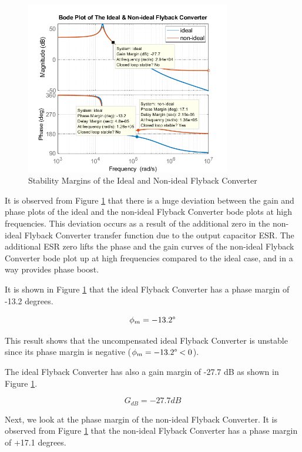 \begin{figure}[H]
\begin{center}
\includegraphics[width=0.8\textwidth]{bode_plots/gain_margin.png}
\caption{Stability Margins of the Ideal and Non-ideal Flyback Converter}
\label{com:bode3}
\end{center}
\end{figure}

It is observed from Figure \ref{com:bode3} that there is a huge deviation between the gain and phase plots of the ideal and the non-ideal Flyback Converter bode plots at high frequencies. This deviation occurs as a result of the additional zero in the non-ideal Flyback Converter transfer function due to the output capacitor ESR. The additional ESR zero lifts the phase and the gain curves of the non-ideal Flyback Converter bode plot up at high frequencies compared to the ideal case, and in a way provides phase boost.

It is shown in Figure \ref{com:bode3} that the ideal Flyback Converter has a phase margin of -13.2 degrees.

$$ \phi_m = -13.2\degree $$

This result shows that the uncompensated ideal Flyback Converter is unstable since its phase margin is negative ($ \phi_m = -13.2\degree < 0 $).

The ideal Flyback Converter has also a gain margin of -27.7 dB as shown in Figure \ref{com:bode3}.

$$ G_{dB} = -27.7 dB $$

Next, we look at the phase margin of the non-ideal Flyback Converter. It is observed from Figure \ref{com:bode3} that the non-ideal Flyback Converter has a phase margin of +17.1 degrees.

